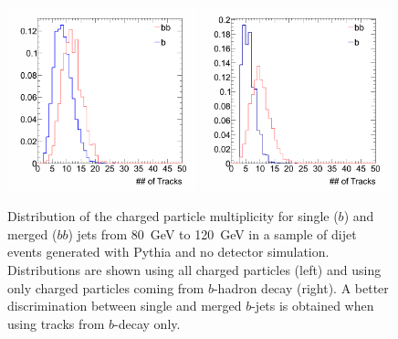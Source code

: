 \begin{figure}[tp]
\centering
\includegraphics[width=0.49\textwidth]{FIGS/TEMPFigs/PythisStandalone/MaxPlots/ntrk_gbb_b_J3_PT80.png}
\includegraphics[width=0.49\textwidth]{FIGS/TEMPFigs/PythisStandalone/MaxPlots/ntrkB_gbb_b_J3_PT80.png}
\caption{Distribution of the charged particle multiplicity for single ($b$) and merged ($bb$) jets from 80~GeV to 120~GeV in a sample of dijet events generated with {\sc Pythia} and no detector simulation. Distributions are shown using all charged particles (left) and using only charged particles coming from $b$-hadron decay (right). A better discrimination between single and merged $b$-jets is obtained when using tracks from $b$-decay only.}
\label{fig:ntrksinglemergedPYTHIA}
\end{figure}


